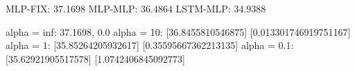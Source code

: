 MLP-FIX: 37.1698
MLP-MLP: 36.4864
LSTM-MLP: 34.9388

alpha = inf: 37.1698, 0.0
alpha = 10: [36.8455810546875] [0.013301746919751167]
alpha = 1: [35.85264205932617] [0.35595667362213135]
alpha = 0.1: [35.62921905517578] [1.0742406845092773]
